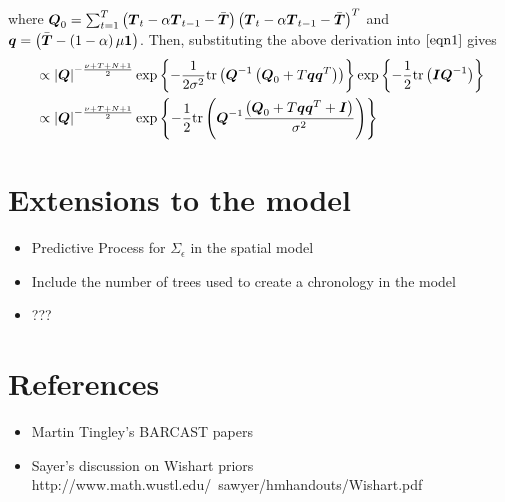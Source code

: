 \documentclass{article}\usepackage[]{graphicx}\usepackage[]{color}
\def\bm#1{\mbox{\boldmath $#1$}}
\begin{document}
%
where $\bm{Q}_0 = \sum_{t = 1}^T \left( \bm{T}_t  - \alpha \bm{T}_{t - 1} - \bar{\bm{T}} \right) \left( \bm{T}_t  - \alpha \bm{T}_{t - 1} - \bar{\bm{T}} \right)^T$ and $\bm{q} = \left( \bar{\bm{T}} - \left( 1 - \alpha \right) \mu \bm{1} \right)$. Then, substituting the above derivation into $\eqref{eqn1}$ gives
%
\begin{align*}
%
& \propto \left| \bm{Q} \right|^{ - \frac{\nu + T + N + 1} {2} } \exp{ \left\{ - \frac{1} {2 \sigma^2} \mbox{tr} \left( \bm{Q}^{ - 1} \left( \bm{Q}_0 + T \bm{q} \bm{q}^T \right) \right) \right\} } \exp{ \left\{ - \frac{1} {2} \mbox{tr}\left( \bm{I} \bm{Q}^{ - 1} \right) \right\} } \\
%
& \propto \left| \bm{Q} \right|^{ - \frac{\nu + T + N + 1} {2} } \exp{ \left\{ - \frac{1} {2} \mbox{tr} \left( \bm{Q}^{ - 1} \frac{ \left( \bm{Q}_0 + T \bm{q} \bm{q}^T + \bm{I} \right) } {\sigma^2} \right) \right\} }\\
%
\end{align*}
%
%
%
%
\section{Extensions to the model}
%
\begin{itemize}
%
\item Predictive Process for $\Sigma_\epsilon$ in the spatial model
\item Include the number of trees used to create a chronology in the model
\item ???
%
\end{itemize}
% 
\section{References}
\begin{itemize}
\item Martin Tingley's BARCAST papers
\item  Sayer's discussion on Wishart priors http://www.math.wustl.edu/~sawyer/hmhandouts/Wishart.pdf
\end{itemize}
\end{document}
